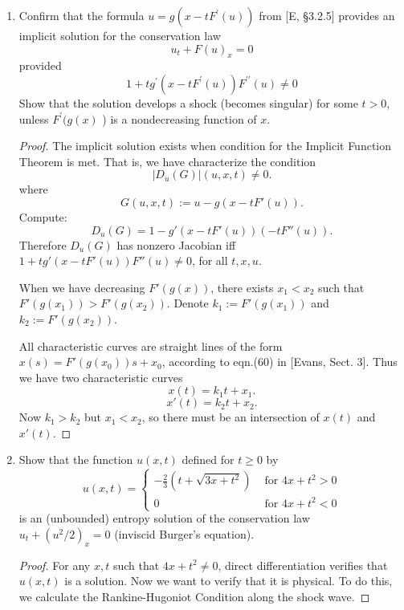\begin{enumerate}
\begin{proof}
Now
\begin{align*}
	\tilde{F}_{\tilde{p}_n}
	&= \Phi^{-1}_{* *}(\tilde\partial_{p_n}) F \\
	&= \partial_{\Phi^{-1}_*(p_n)} F \\
	&= \partial_{p \cdot \vec{n}} F \\
	&= \partial_p F \cdot \vec{n} \\
	&= F_p \cdot \vec{n}
.\end{align*}
Now $\vec{n}$ and $\vec{\nu}$ are identical up to scaling, by definition. So we have the claim.

\end{proof}


\item
Confirm that the formula $u=g\left(x-t F^{\prime}(u)\right)$ from [E, §3.2.5] provides an implicit solution for the conservation law
\[
u_t+F(u)_x=0
\]
provided
\[
1+t g^{\prime}\left(x-t F^{\prime}(u)\right) F^{\prime \prime}(u) \neq 0
\]
Show that the solution develops a shock (becomes singular) for some $t>0$, unless $F^{\prime}(g(x)$ ) is a nondecreasing function of $x$.

\begin{proof}
	The implicit solution exists when condition for the Implicit Function Theorem is met. That is, we have characterize the condition
	\[
		|D_u (G)|(u, x, t) \neq  0
	.\] 
	where
	\[
		G(u, x, t) := u - g\left(x - t F'(u)\right)
	.\] 
	Compute:
	\[
		D_u(G) = 1 - g'\left(x - t F'(u)\right) \left(- t F''(u)\right)
	.\] 
	Therefore $D_u(G)$ has nonzero Jacobian iff $1 + t g'(x - tF'(u)) F''(u)  \neq 0$, for all $t, x, u$.

	When we have decreasing $F'(g(x)) $, there exists $x_1 < x_2$ such that $F'(g(x_1)) > F'(g(x_2))$. Denote $k_1:=F'(g(x_1))$ and $k_2 :=F'(g(x_2))$. 

	All characteristic curves are straight lines of the form $x(s) = F'(g(x_0)) s + x_0$, according to eqn.(60) in [Evans, Sect. 3]. Thus we have two characteristic curves
	\[
		x(t) = k_1 t + x_1
	.\] 
	\[
		x'(t) = k_2 t + x_2
	.\] 
	Now $k_1 > k_2$ but $x_1 < x_2$, so there must be an intersection of $x(t)$ and $x'(t)$.
\end{proof}


\item
Show that the function $u(x, t)$ defined for $t \geq 0$ by
\[
u(x, t)= \begin{cases}-\frac{2}{3}\left(t+\sqrt{3 x+t^2}\right) & \text { for } 4 x+t^2>0 \\ 0 & \text { for } 4 x+t^2<0\end{cases}
\]
is an (unbounded) entropy solution of the conservation law $u_t+\left(u^2 / 2\right)_x=0$ (inviscid Burger's equation).
\begin{proof}
	For any $x, t$ such that $4x + t^2 \neq 0$, direct differentiation verifies that $u(x,t)$ is a solution. Now we want to verify that it is physical. To do this, we calculate the Rankine-Hugoniot Condition along the shock wave. 


\end{proof}
\end{enumerate}
